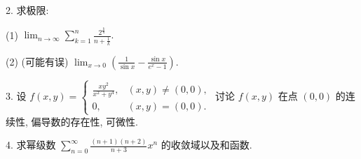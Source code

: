 \documentclass{examcollection}
\begin{document}
{\begin{minipage}{\textwidth}
2. 求极限:\par
(1) $\lim_{n\to \infty}\sum_{k = 1}^{n}\frac{2^{\frac{k}{n}}}{n + \frac{1}{k}}.$\par
(2) (可能有误) $\lim_{x\to 0}\left(\frac{1}{\sin x} -\frac{\sin x}{e^x - 1}\right).$\par
3. 设 $f(x, y) = \begin{cases} \frac{xy^2}{x^2 + y^4}, & (x, y) \neq (0, 0), \\ 0, & (x, y) = (0, 0). \end{cases}$ 讨论 $f(x, y)$ 在点 $(0, 0)$ 的连续性, 偏导数的存在性, 可微性.\par
4. 求幂级数 $\sum_{n=0}^{\infty} \frac{(n+1)(n+2)}{n+3} x^n$ 的收敛域以及和函数.\par
\end{minipage}}
\ifdim\dimexpr\ht\proofbox+\dp\proofbox\relax>\textheight
\noindent\resizebox{!}{\textheight}{\usebox{\proofbox}}\else\noindent\usebox{\proofbox}\fi\clearpage
\end{document}
